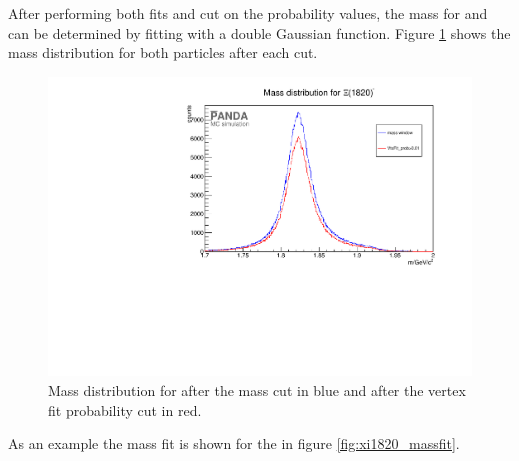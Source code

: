 	After performing both fits and cut on the probability values, the mass for \excitedcascade and \excitedanticascade
	can be determined by fitting with a double Gaussian function. 
	Figure \ref{fig:xi1820_mass_diffcuts} shows the mass distribution for both particles after each cut.
	
	\begin{figure}
		\centering
		\includegraphics[width=1.\textwidth]{./plots/Xi1820/XiMinus1820_m_diffcuts.pdf}
		\caption{\propose Mass distribution for \excitedcascade after the mass cut in blue and after the vertex fit probability cut in red.}
		\label{fig:xi1820_mass_diffcuts}
	
	\end{figure}
	As an example the mass fit is shown for the \excitedcascade in figure \ref{fig:xi1820_massfit}. 
	
